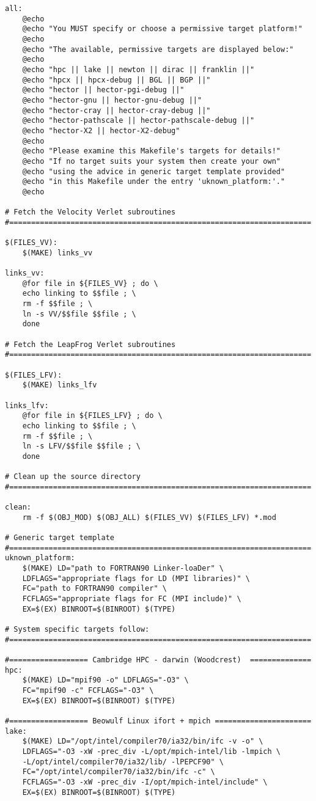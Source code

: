\begin{verbatim}
all:
	@echo
	@echo "You MUST specify or choose a permissive target platform!"
	@echo
	@echo "The available, permissive targets are displayed below:"
	@echo
	@echo "hpc || lake || newton || dirac || franklin ||"
	@echo "hpcx || hpcx-debug || BGL || BGP ||"
	@echo "hector || hector-pgi-debug ||"
	@echo "hector-gnu || hector-gnu-debug ||"
	@echo "hector-cray || hector-cray-debug ||"
	@echo "hector-pathscale || hector-pathscale-debug ||"
	@echo "hector-X2 || hector-X2-debug"
	@echo
	@echo "Please examine this Makefile's targets for details!"
	@echo "If no target suits your system then create your own"
	@echo "using the advice in generic target template provided"
	@echo "in this Makefile under the entry 'uknown_platform:'."
	@echo

# Fetch the Velocity Verlet subroutines
#=====================================================================

$(FILES_VV):
	$(MAKE) links_vv

links_vv:
	@for file in ${FILES_VV} ; do \
	echo linking to $$file ; \
	rm -f $$file ; \
	ln -s VV/$$file $$file ; \
	done

# Fetch the LeapFrog Verlet subroutines
#=====================================================================

$(FILES_LFV):
	$(MAKE) links_lfv

links_lfv:
	@for file in ${FILES_LFV} ; do \
	echo linking to $$file ; \
	rm -f $$file ; \
	ln -s LFV/$$file $$file ; \
	done

# Clean up the source directory
#=====================================================================

clean:
	rm -f $(OBJ_MOD) $(OBJ_ALL) $(FILES_VV) $(FILES_LFV) *.mod

# Generic target template
#=====================================================================
uknown_platform:
	$(MAKE) LD="path to FORTRAN90 Linker-loaDer" \
	LDFLAGS="appropriate flags for LD (MPI libraries)" \
	FC="path to FORTRAN90 compiler" \
	FCFLAGS="appropriate flags for FC (MPI include)" \
	EX=$(EX) BINROOT=$(BINROOT) $(TYPE)

# System specific targets follow:
#=====================================================================

#================== Cambridge HPC - darwin (Woodcrest)  ==============
hpc:
	$(MAKE) LD="mpif90 -o" LDFLAGS="-O3" \
	FC="mpif90 -c" FCFLAGS="-O3" \
	EX=$(EX) BINROOT=$(BINROOT) $(TYPE)

#================== Beowulf Linux ifort + mpich ======================
lake:
	$(MAKE) LD="/opt/intel/compiler70/ia32/bin/ifc -v -o" \
	LDFLAGS="-O3 -xW -prec_div -L/opt/mpich-intel/lib -lmpich \
	-L/opt/intel/compiler70/ia32/lib/ -lPEPCF90" \
	FC="/opt/intel/compiler70/ia32/bin/ifc -c" \
	FCFLAGS="-O3 -xW -prec_div -I/opt/mpich-intel/include" \
	EX=$(EX) BINROOT=$(BINROOT) $(TYPE)


\end{verbatim}
